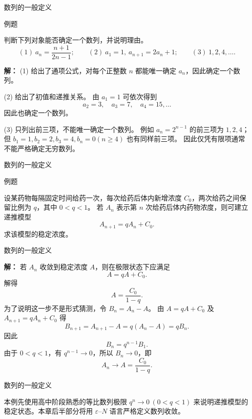 \documentclass[aspectratio=169,10pt,fontset=fandol]{ctexbeamer}
\newenvironment{custom}[1]{\par\noindent\textbf{#1}\quad}{\par\vspace{0.8em}}
\begin{document}
\begin{frame}[t,fragile]{数列的一般定义}
\footnotesize
\begin{block}{例题}
{\footnotesize
判断下列对象能否确定一个数列，并说明理由。
\[
(1)\ a_n=\frac{n+1}{2n-1};\qquad
(2)\ a_1=1,\ a_{n+1}=2a_n+1;\qquad
(3)\ 1,2,4,\ldots .
\]

}
\end{block}
\pause
{\footnotesize
\textbf{解：}
(1) 给出了通项公式，对每个正整数 $n$ 都能唯一确定 $a_n$，因此确定一个数列。

(2) 给出了初值和递推关系。 由 $a_1=1$ 可依次得到
\[
a_2=3,\quad a_3=7,\quad a_4=15,\ldots
\]
因此也确定一个数列。

(3) 只列出前三项，不能唯一确定一个数列。 例如 $a_n=2^{n-1}$ 的前三项为 $1,2,4$；但 $b_1=1,b_2=2,b_3=4,b_n=0(n\ge4)$ 也有同样前三项。 因此仅凭有限项通常不能严格确定无穷数列。

}
\end{frame}
\begin{frame}[t,fragile]{数列的一般定义}
\footnotesize
\begin{block}{例题}
{\footnotesize
设某药物每隔固定时间给药一次，每次给药后体内新增浓度 $C_0$，两次给药之间保留比例为 $q$，其中 $0<q<1$。 若 $A_n$ 表示第 $n$ 次给药后体内药物浓度，则可建立递推模型
\[
A_{n+1}=qA_n+C_0.
\]
求该模型的稳定浓度。

}
\end{block}
\end{frame}
\begin{frame}[t,fragile]{数列的一般定义}
\footnotesize
{\footnotesize
\textbf{解：}
若 $A_n$ 收敛到稳定浓度 $A$，则在极限状态下应满足
\[
A=qA+C_0.
\]
解得
\[
A=\frac{C_0}{1-q}.
\]
为了说明这一步不是形式猜测，令 $B_n=A_n-A$。 由 $A=qA+C_0$ 及 $A_{n+1}=qA_n+C_0$ 得
\[
B_{n+1}=A_{n+1}-A=q(A_n-A)=qB_n.
\]
因此
\[
B_n=q^{n-1}B_1.
\]
由于 $0<q<1$，有 $q^{n-1}\to0$，所以 $B_n\to0$，即
\[
A_n\to A=\frac{C_0}{1-q}.
\]

}
\end{frame}
\begin{frame}[t,fragile]{数列的一般定义}
\footnotesize
{\footnotesize
本例先使用高中阶段熟悉的等比数列极限 $q^n\to0\ (0<q<1)$ 来说明递推模型的稳定状态。本章后半部分将用 $\varepsilon$--$N$ 语言严格定义数列收敛。

}
\end{frame}
\end{document}
